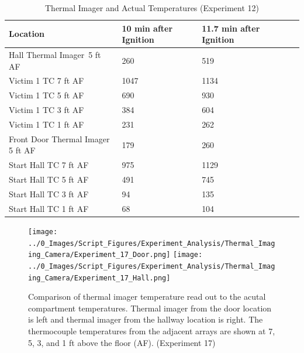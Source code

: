 \documentclass[12pt,oneside]{book}
\begin{document}
\begin{table}[H]
\centering
\begin{tabular}{|L{0.25\textwidth}|C{0.15\textwidth}|C{0.15\textwidth}|C{0.15\textwidth}|C{0.15\textwidth}|}
\hline
Location	                    &10 min after Ignition	&11.7 min after Ignition \\ \hline \hline
Hall Thermal Imager~5 ft AF 	&260	&519	\\ \hline
Victim 1 TC 7 ft AF				&1047	&1134	\\ \hline
Victim 1 TC 5 ft AF				&690	&930	\\ \hline
Victim 1 TC 3 ft AF				&384	&604	\\ \hline
Victim 1 TC 1 ft AF				&231	&262	\\ \hline
Front Door Thermal Imager 5 ft AF &179	&260	\\ \hline
Start Hall TC 7 ft AF			&975	&1129	\\ \hline
Start Hall TC 5 ft AF			&491	&745	\\ \hline
Start Hall TC 3 ft AF			&94		&135	\\ \hline
Start Hall TC 1 ft AF			&68		&104	\\ \hline
\end{tabular}
\caption{Thermal Imager and Actual Temperatures (Experiment 12)}
\label{table:hall_thermal_imager_12}
\end{table}

\begin{figure}[H]
\centering
\texttt{[image: ../0\_Images/Script\_Figures/Experiment\_Analysis/Thermal\_Imaging\_Camera/Experiment\_17\_Door.png]}
\texttt{[image: ../0\_Images/Script\_Figures/Experiment\_Analysis/Thermal\_Imaging\_Camera/Experiment\_17\_Hall.png]}
\caption[Thermal Imager H]{Comparison of thermal imager temperature read out to the acutal compartment temperatures. Thermal imager from the door location is left and thermal imager from the hallway location is right. The thermocouple temperatures from the adjacent arrays are shown at 7, 5, 3, and 1 ft above the floor (AF). (Experiment 17)}
\label{fig:thermal_imager_i}
\end{figure}
\end{document}
